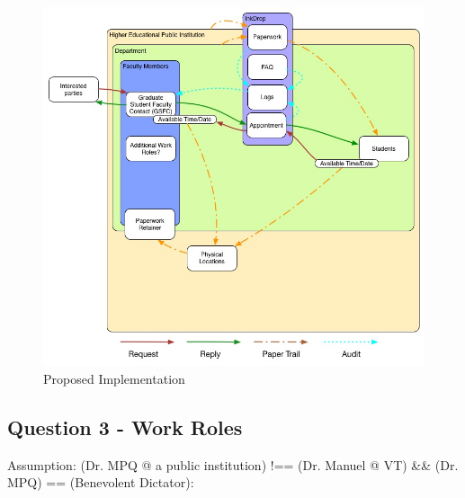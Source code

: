 \documentclass[11pt]{article}
\begin{document}
  \begin{figure}[H]
  \centering
  \includegraphics[height=0.9\linewidth]{img/workflow-proposed.jpg}
  \caption{Proposed Implementation}
  \label{fig:proposed}
  \end{figure}

  \subsection*{Question 3 - Work Roles}
  Assumption: (Dr. MPQ @ a public institution) !== (Dr. Manuel @ VT) \&\& (Dr. MPQ) == (Benevolent Dictator):
\end{document}
